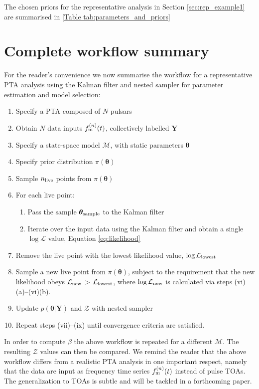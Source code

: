 \documentclass[fleqn,usenatbib,useAMS]{mnras}
\begin{document}
The chosen priors for the representative analysis in Section \ref{sec:rep_example1} are summarised in \ref{Table tab:parameters_and_priors}


\section{Complete workflow summary}

For the reader's convenience we now summarise the workflow for a representative PTA analysis using the Kalman filter and nested sampler for parameter estimation and model selection:
\begin{enumerate}[leftmargin=2em]
	\item Specify a PTA composed of $N$ pulsars 
	\item Obtain $N$ data inputs $f_{\rm m}^{(n)}(t)$, collectively labelled $\boldsymbol{Y}$
	\item Specify a state-space model $\mathcal{M}$, with static parameters $\boldsymbol{\theta}$
	\item Specify prior distribution $\pi(\boldsymbol{\theta})$
	\item Sample $n_{\rm live}$ points from $\pi(\boldsymbol{\theta})$ 
	\item For each live point:
	\begin{enumerate}[leftmargin=2em]
		\item Pass the sample $\boldsymbol{\theta}_{\rm sample}$ to the Kalman filter
		\item Iterate over the input data using the Kalman filter and obtain a single $\log \mathcal{L}$ value, Equation \eqref{eq:likelihood}
	\end{enumerate}
	\item Remove the live point with the lowest likelihood value, $\log \mathcal{L}_{\rm lowest}$
	\item Sample a new live point from $\pi(\boldsymbol{\theta})$, subject to the requirement that the new likelihood obeys $\mathcal{L}_{\rm new}$ > $\mathcal{L}_{\rm lowest}$, where $\log \mathcal{L}_{\rm new}$ is calculated via steps (vi)(a)--(vi)(b).
	\item Update $p\left(\boldsymbol{\theta}|\boldsymbol{Y}\right)$ and $\mathcal{Z}$ with nested sampler
	\item Repeat steps (vii)--(ix) until convergence criteria are satisfied.
\end{enumerate}
In order to compute $\beta$ the above workflow is repeated for a different $\mathcal{M}$. The resulting $\mathcal{Z}$ values can then be compared. We remind the reader that the above workflow differs from a realistic PTA analysis in one important respect, namely that the data are input as frequency time series $f_{\rm m}^{(n)}(t)$ instead of pulse TOAs. The generalization to TOAs is subtle and will be tackled in a forthcoming paper.
\end{document}
